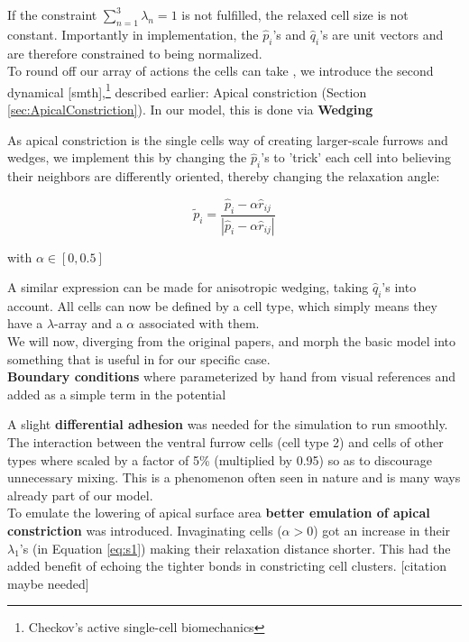 If the constraint $\sum_{n=1}^{3}\lambda_n=1$ is not fulfilled, the relaxed cell size is not constant. Importantly in implementation, the $\hat{p}_i$'s and $\hat{q}_i$'s are unit vectors and are therefore constrained to being normalized.\reph\\

To round off our array of actions the cells can take \reph, we introduce the second dynamical [smth],\footnote{Checkov's active single-cell biomechanics} described earlier: Apical constriction (Section \ref{sec:ApicalConstriction}). In our model, this is done via \textbf{Wedging}

As apical constriction is the single cells way of creating larger-scale furrows and wedges, we implement this by changing the $\hat{p}_i$'s to 'trick' each cell into believing their neighbors are differently oriented, thereby changing the relaxation angle:

\begin{equation}
    \tilde{{p}}_i = \frac{\hat{p}_i-\alpha \widehat{{r}}_{i j}}{|\hat{p}_i-\alpha \widehat{{r}}_{i j}|} 
\end{equation}

with $\alpha\in [0,0.5]$ 



A similar expression can be made for anisotropic wedging, taking  $\hat{q}_i$'s into account. All cells can now be defined by a cell type, which simply means they have a $\lambda$-array and a $\alpha$ associated with them. \\


We will now, diverging from the original papers, and morph the basic model into something that is useful in for our specific case.\\

\textbf{Boundary conditions} where parameterized by hand from visual references and added as a simple term in the potential 

A slight \textbf{differential adhesion} was needed for the simulation to run smoothly. The interaction between the ventral furrow cells (cell type 2) and cells of other types where scaled by a factor of 5\% (multiplied by 0.95) so as to discourage unnecessary mixing. This is a phenomenon often seen in nature and is many ways already part of our model.\\

To emulate the lowering of apical surface area \textbf{better emulation of apical constriction} was introduced. Invaginating cells ($\alpha > 0$) got an increase in their $\lambda_1$'s (in Equation \ref{eq:s1}) making their relaxation distance shorter. This had the added benefit of echoing the tighter bonds in constricting cell clusters. [citation maybe needed]\\

